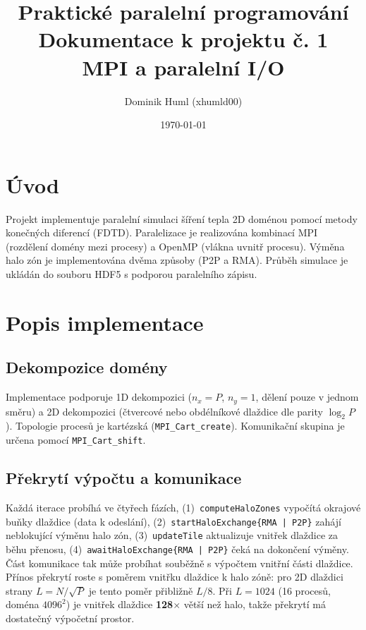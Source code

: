 \documentclass{article}
\title{Praktické paralelní programování\\Dokumentace k projektu č. 1\\MPI a paralelní I/O}
\author{Dominik Huml (xhumld00)}
\date{\today}
\begin{document}
\maketitle

\section{Úvod}
\label{sec:uvod}

Projekt implementuje paralelní simulaci šíření tepla 2D doménou pomocí
metody konečných diferencí (FDTD).
Paralelizace je realizována kombinací MPI (rozdělení domény mezi procesy)
a OpenMP (vlákna uvnitř procesu). Výměna halo zón je implementována dvěma způsoby (P2P a RMA).
Průběh simulace je ukládán do souboru HDF5 s podporou paralelního zápisu.

\section{Popis implementace}
\label{sec:implementace}

\subsection*{Dekompozice domény}
Implementace podporuje 1D dekompozici ($n_x = P$, $n_y = 1$, dělení pouze v jednom směru)
a 2D dekompozici (čtvercové nebo obdélníkové dlaždice dle parity $\log_2 P$).
Topologie procesů je kartézská (\texttt{MPI\_Cart\_create}).
Komunikační skupina je určena pomocí \texttt{MPI\_Cart\_shift}.

\subsection*{Překrytí výpočtu a komunikace}
Každá iterace probíhá ve čtyřech fázích,
(1)~\texttt{computeHaloZones} vypočítá okrajové buňky dlaždice (data k odeslání),
(2)~\texttt{startHaloExchange\{RMA | P2P\}} zahájí neblokující výměnu halo zón,
(3)~\texttt{updateTile} aktualizuje vnitřek dlaždice za běhu přenosu,
(4)~\texttt{awaitHaloExchange\{RMA | P2P\}} čeká na dokončení výměny.
Část komunikace tak může probíhat souběžně s výpočtem vnitřní části dlaždice.
Přínos překrytí roste s poměrem vnitřku dlaždice k halo zóně:
pro 2D dlaždici strany $L = N/\sqrt{P}$ je tento poměr přibližně $L/8$.
Při $L = 1024$ (16 procesů, doména $4096^2$) je vnitřek dlaždice
\textbf{128$\times$} větší než halo, takže překrytí má dostatečný výpočetní prostor.
\end{document}
